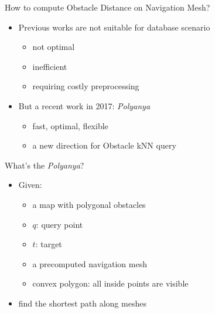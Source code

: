 \begin{frame}{How to compute Obstacle Distance on Navigation Mesh?}
\begin{itemize}
    \item Previous works are not suitable for database scenario
    \begin{itemize}
        \item not optimal
        \item inefficient
        \item requiring costly preprocessing
    \end{itemize}
    \item \small But a recent work in 2017: \textit{Polyanya}
    \begin{itemize}
        \item fast, optimal, flexible
        \item a new direction for Obstacle kNN query
    \end{itemize}
    
\end{itemize}
\end{frame}

\begin{frame}{What's the \textit{Polyanya}?}

\begin{minipage}{.4\textwidth}
\begin{itemize}
    \item<1-> \small Given:
    \begin{itemize}
        \item \small a map with polygonal obstacles
        \item \small $q$: query point
        \item \small $t$: target
        \item \small a precomputed navigation mesh
        \item \small convex polygon: all inside points are visible
    \end{itemize}
    \item \small find the shortest path along meshes
\end{itemize}

\end{minipage}%
\begin{minipage}{.6\textwidth}
\begin{adjustbox}{max totalsize={.9\textwidth}{.9\textheight}, right}
\end{adjustbox}
\end{minipage}
\end{frame}

